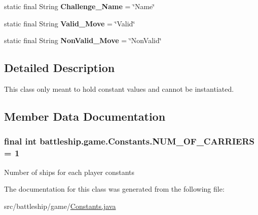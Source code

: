 \begin{DoxyCompactItemize}
\item 
\hypertarget{classbattleship_1_1game_1_1Constants_a49494ccc1db014de1709acc92ed7cc67}{}static final String {\bfseries Challenge\+\_\+\+Name} = \char`\"{}Name\char`\"{}\label{classbattleship_1_1game_1_1Constants_a49494ccc1db014de1709acc92ed7cc67}

\item 
\hypertarget{classbattleship_1_1game_1_1Constants_a79d39ca8c5014ea7df8dbd4ad21e65ca}{}static final String {\bfseries Valid\+\_\+\+Move} = \char`\"{}Valid\char`\"{}\label{classbattleship_1_1game_1_1Constants_a79d39ca8c5014ea7df8dbd4ad21e65ca}

\item 
\hypertarget{classbattleship_1_1game_1_1Constants_acf1cbddcd3d2e089f074c0b8e53162bc}{}static final String {\bfseries Non\+Valid\+\_\+\+Move} = \char`\"{}Non\+Valid\char`\"{}\label{classbattleship_1_1game_1_1Constants_acf1cbddcd3d2e089f074c0b8e53162bc}

\end{DoxyCompactItemize}


\subsection{Detailed Description}
This class only meant to hold constant values and cannot be instantiated. 

\subsection{Member Data Documentation}
\hypertarget{classbattleship_1_1game_1_1Constants_aadb1c142f1d3dcf51377758034c71ed6}{}
\subsubsection[{N\+U\+M\+\_\+\+O\+F\+\_\+\+C\+A\+R\+R\+I\+E\+R\+S}]{\setlength{\rightskip}{0pt plus 5cm}final int battleship.\+game.\+Constants.\+N\+U\+M\+\_\+\+O\+F\+\_\+\+C\+A\+R\+R\+I\+E\+R\+S = 1\hspace{0.3cm}{\ttfamily [static]}}\label{classbattleship_1_1game_1_1Constants_aadb1c142f1d3dcf51377758034c71ed6}
Number of ships for each player constants 

The documentation for this class was generated from the following file\+:\begin{DoxyCompactItemize}
\item 
src/battleship/game/\hyperlink{Constants_8java}{Constants.\+java}\end{DoxyCompactItemize}
